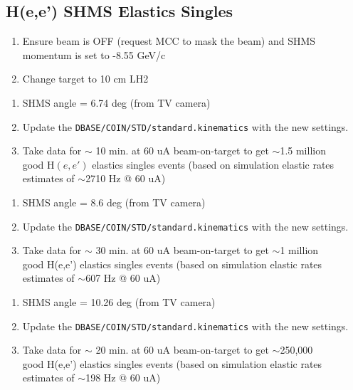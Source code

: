 \documentclass{article}
\begin{document}
\subsection*{H(e,e') SHMS Elastics Singles}
\begin{enumerate}
    \item Ensure beam is OFF (request MCC to mask the beam) and SHMS momentum is set to -8.55 GeV/c
    \item Change target to 10 cm LH2 
    \end{enumerate}

    \begin{enumerate}
    \subsection*{H(e,e') Elastics Kin-Setting 2}
    \item SHMS angle = 6.74 deg (from TV camera)
    \item Update the \texttt{DBASE/COIN/STD/standard.kinematics} with the new settings.
    \item Take data for $\sim$ 10  min. at 60 uA beam-on-target to get $\sim$1.5 million \\
    good H$(e,e')$ elastics singles events (based on simulation elastic rates estimates of $\sim$2710 Hz @ 60 uA)
    \end{enumerate}
    
    \begin{enumerate}
    \subsection*{H(e,e') Elastics Kin-Setting 1}
    \item SHMS angle = 8.6 deg (from TV camera)
    \item Update the \texttt{DBASE/COIN/STD/standard.kinematics} with the new settings.
    \item Take data for $\sim$ 30  min. at 60 uA beam-on-target to get $\sim$1 million \\
     good H(e,e') elastics singles events (based on simulation elastic rates estimates of $\sim$607 Hz @ 60 uA)
    \end{enumerate}
    
    \begin{enumerate}
    \subsection*{H(e,e') Elastics Kin-Setting 0}
    \item SHMS angle = 10.26 deg (from TV camera)
    \item Update the \texttt{DBASE/COIN/STD/standard.kinematics} with the new settings.
    \item Take data for $\sim$ 20  min. at 60 uA beam-on-target to get $\sim$250,000 \\
     good H(e,e') elastics singles events (based on simulation elastic rates estimates of $\sim$198 Hz @ 60 uA)
    \end{enumerate}
\end{document}
